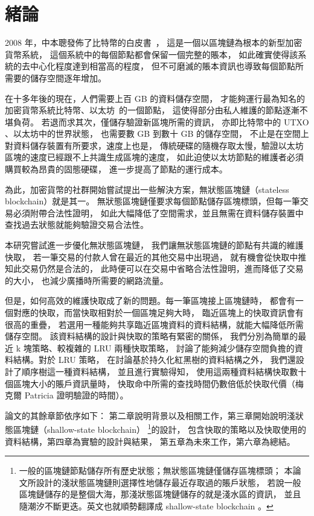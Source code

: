 \chapter{緒論}
\label{c:intro}

2008 年，中本聰發佈了比特幣的白皮書~\cite{nakamoto2019bitcoin}，
這是一個以區塊鏈為根本的新型加密貨幣系統，
這個系統中的每個節點都會保留一個完整的賬本，
如此確實使得該系統的去中心化程度達到相當高的程度，
但不可磨滅的賬本資訊也導致每個節點所需要的儲存空間逐年增加。

在十多年後的現在，人們需要上百 GB 的資料儲存空間，
才能夠運行最為知名的加密貨幣系統比特幣、以太坊~\cite{wood2014ethereum}的一個節點，
這使得部分由私人維護的節點逐漸不堪負荷。
若退而求其次，僅儲存驗證新區塊所需的資訊，
亦即比特幣中的 UTXO 、以太坊中的世界狀態，
也需要數 GB 到數十 GB 的儲存空間，
不止是在空間上對資料儲存裝置有所要求，速度上也是，
傳統硬碟的隨機存取太慢，驗證以太坊區塊的速度已經跟不上共識生成區塊的速度，
如此迫使以太坊節點的維護者必須購買較為昂貴的固態硬碟，
進一步提高了節點的運行成本。

為此，加密貨幣的社群開始嘗試提出一些解決方案，無狀態區塊鏈（stateless blockchain）就是其一。
無狀態區塊鏈僅要求每個節點儲存區塊標頭，但每一筆交易必須附帶合法性證明，
如此大幅降低了空間需求，並且無需在資料儲存裝置中查找過去狀態就能夠驗證交易合法性。

本研究嘗試進一步優化無狀態區塊鏈，
我們讓無狀態區塊鏈的節點有共識的維護快取，
若一筆交易的付款人曾在最近的其他交易中出現過，
就有機會從快取中推知此交易仍然是合法的，
此時便可以在交易中省略合法性證明，進而降低了交易的大小，
也減少廣播時所需要的網路流量。

但是，如何高效的維護快取成了新的問題。每一筆區塊接上區塊鏈時，
都會有一個對應的快取，而當快取相對於一個區塊足夠大時，
臨近區塊上的快取資訊會有很高的重疊，
若選用一種能夠共享臨近區塊資料的資料結構，就能大幅降低所需儲存空間。
該資料結構的設計與快取的策略有緊密的關係，
我們分別為簡單的最近 k 塊策略、較複雜的 LRU 兩種快取策略，
討論了能夠減少儲存空間負擔的資料結構。對於 LRU 策略，
在討論基於持久化紅黑樹的資料結構之外，
我們還設計了順序樹這一種資料結構，
並且進行實驗得知，
使用這兩種資料結構快取數十個區塊大小的賬戶資訊量時，
快取命中所需的查找時間仍數倍低於快取代價（梅克爾 Patricia 證明驗證的時間）。

論文的其餘章節依序如下：
第二章說明背景以及相關工作，第三章開始說明淺狀態區塊鏈（shallow-state blockchain）
\footnote{一般的區塊鏈節點儲存所有歷史狀態；無狀態區塊鏈僅儲存區塊標頭；
本論文所設計的淺狀態區塊鏈則選擇性地儲存最近存取過的賬戶狀態，
若說一般區塊鏈儲存的是整個大海，那淺狀態區塊鏈儲存的就是淺水區的資訊，
並且隨潮汐不斷更迭。英文也就順勢翻譯成 shallow-state blockchain 。}的設計，
包含快取的策略以及快取使用的資料結構，第四章為實驗的設計與結果，
第五章為未來工作，第六章為總結。